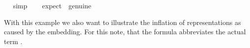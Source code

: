 \begin{isabellebody}
\isadelimproof
\ %
\endisadelimproof
%
\isatagproof
{}\isamarkupfalse%
\ simp%
\endisatagproof
{\isafoldproof}%
%
\isadelimproof
%
\endisadelimproof
\ \isamarkupfalse%
\ \ {\isacharbrackleft}expect\ {\isacharequal}\ genuine{\isacharbrackright}%
\isadelimproof
\ %
\endisadelimproof
%
\isatagproof
{}\isamarkupfalse%
\ %
%
\endisatagproof
{\isafoldproof}%
%
\isadelimproof
%
\endisadelimproof
%
\begin{isamarkuptext}%
With this example we also want to illustrate the inflation of representations as caused by the
     embedding. For this note, that the formula  abbreviates the
    actual term  
   .

\end{isamarkuptext}
\end{isabellebody}
